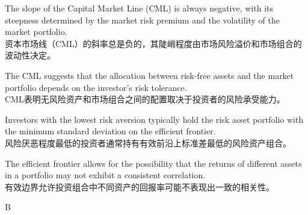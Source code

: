 \documentclass{article}
\begin{document}
\begin{choices}
    \item The slope of the Capital Market Line (CML) is always negative, with its steepness determined by the market risk premium and the volatility of the market portfolio.
    \\
    资本市场线（CML）的斜率总是负的，其陡峭程度由市场风险溢价和市场组合的波动性决定。
    \item The CML suggests that the allocation between risk-free assets and the market portfolio depends on the investor's risk tolerance.
    \\
    CML表明无风险资产和市场组合之间的配置取决于投资者的风险承受能力。
    \item Investors with the lowest risk aversion typically hold the risk asset portfolio with the minimum standard deviation on the efficient frontier.
    \\
    风险厌恶程度最低的投资者通常持有有效前沿上标准差最低的风险资产组合。
    \item The efficient frontier allows for the possibility that the returns of different assets in a portfolio may not exhibit a consistent correlation.
    \\
    有效边界允许投资组合中不同资产的回报率可能不表现出一致的相关性。
\end{choices}

\begin{correctanswer}
   B
\end{correctanswer}
\end{document}
